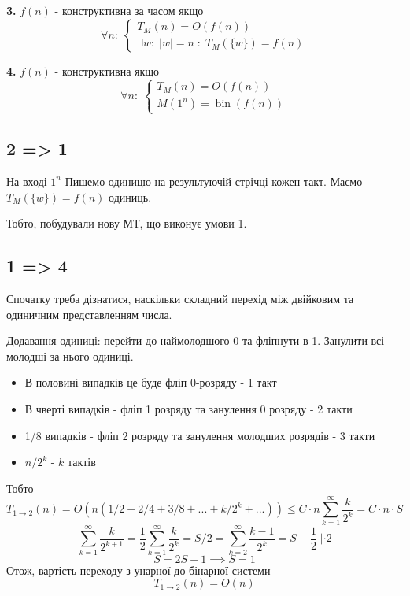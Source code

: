 \documentclass[11pt, a4paper]{article} %
\begin{document}
\begin{mdframed}
    \textbf{3.} $f(n)$ - конструктивна за часом якщо
    $$\forall n:\;
    \begin{cases}
        T_M(n) = O(f(n)) \\
        \exists w:\; |w|=n \;:\; T_M(\{w\}) = f(n)
    \end{cases}
    $$
\end{mdframed}

\begin{mdframed}
    \textbf{4.} $f(n)$ - конструктивна якщо
    $$\forall n:\;
    \begin{cases}
        T_M(n) = O(f(n)) \\
        M(1^n) = \operatorname{bin}(f(n))
    \end{cases}
    $$
\end{mdframed}

\subsection*{2 => 1}
На вході $1^n$
Пишемо одиницю на результуючій стрічці кожен такт. 
Маємо $T_M(\{w\}) = f(n)$ одиниць.

Тобто, побудували нову МТ, що виконує умови 1. \;\qedsymbol

\subsection*{1 => 4}
Спочатку треба дізнатися, наскільки складний перехід між двійковим та одиничним представленням числа.

Додавання одиниці: перейти до наймолодшого 0 та фліпнути в 1. Занулити всі молодші за нього одиниці.

\begin{itemize}
    \item В половині випадків це буде фліп 0-розряду - 1 такт
    \item В чверті випадків - фліп 1 розряду та занулення 0 розряду - 2 такти
    \item 1/8 випадків - фліп 2 розряду та занулення молодших розрядів - 3 такти
    \item $n/2^{k}$ - $k$ тактів
\end{itemize}

Тобто $$T_{1\to 2}(n) = O(n(1/2 + 2/4 + 3/8 + ... + k/2^k + ...)) \le C\cdot n \sum_{k=1}^\infty \frac{k}{2^k} = C \cdot n\cdot S$$
$$
\sum_{k=1}^\infty \frac{k}{2^{k+1}} = \frac{1}{2} \sum_{k=1}^\infty \frac{k}{2^{k}} = S/2 = \sum_{k=2}^\infty \frac{k-1}{2^k} = S - \frac{1}{2} \; | \cdot 2
$$
$$
S = 2S - 1 \implies S = 1
$$
Отож, вартість переходу з унарної до бінарної системи
$$ T_{1 \to 2}(n) = O(n) $$
\end{document}
